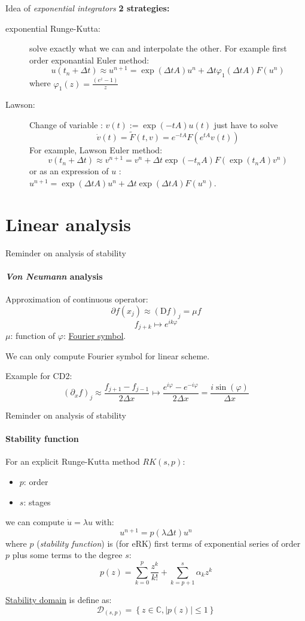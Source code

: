 \documentclass{beamer}
\begin{document}
\begin{frame}{Idea of \emph{exponential integrators}}
  \textbf{2 strategies:}
  \begin{description}
    \item[exponential Runge-Kutta:] solve exactly what we can and interpolate the other. For example first order exponantial Euler method: $$u(t_n+\Delta t) \approx u^{n+1} = \exp(\Delta tA)u^n + \Delta t\varphi_1(\Delta tA)F(u^n)$$ where $\varphi_1(z) = \frac{(e^z-1)}{z}$

    \item[Lawson:] Change of variable : $v(t):=\exp(-tA)u(t)$ just have to solve $$\dot{v}(t)=\tilde{F}(t,v)=e^{-tA}F(e^{tA}v(t))$$
    For example, Lawson Euler method:
    $$v(t_n+\Delta t) \approx v^{n+1} = v^{n} + \Delta t \exp(-t_n A) F(\exp(t_n A)v^{n})$$
     or as an expression of $u$ : $u^{n+1} = \exp(\Delta t A) u^{n} + \Delta t \exp(\Delta t A) F(u^{n})$.
  \end{description}
\end{frame}

\section{Linear analysis}
\begin{frame}{Reminder on analysis of stability}
  \framesubtitle{\emph{Von Neumann} analysis}
  Approximation of continuous operator:
  $$
    \partial f(x_j) \approx (\mathrm{D}f)_j = \mu f
  $$
  $$f_{j+k} \mapsto e^{ik \varphi}$$ $\mu$: function of $\varphi$: \underline{Fourier symbol}.

  We can only compute Fourier symbol for linear scheme.

  Example for CD2: $$(\partial_xf)_j\approx\frac{f_{j+1}-f_{j-1}}{2\Delta x}\mapsto \frac{e^{i\varphi}-e^{-i\varphi}}{2\Delta x}=\frac{i\sin(\varphi)}{\Delta x}$$
\end{frame}

\begin{frame}{Reminder on analysis of stability}
  \framesubtitle{Stability function}
  For an explicit Runge-Kutta method $RK(s,p)$: \begin{multicols}{2}\begin{itemize}\item $p$: order \item $s$: stages\end{itemize}\end{multicols} we can compute $\dot u = \lambda u$ with: $$u^{n+1} = p(\lambda\Delta t)u^n$$
  where $p$ (\emph{stability function}) is (for eRK) first terms of exponential series of order $p$ plus some terms to the degree $s$: $$p(z) = \sum_{k=0}^p\frac{z^k}{k!}+\sum_{k=p+1}^s\alpha_kz^k$$

  \underline{Stability domain} is define as: $$\mathcal{D}_{(s,p)} = \left\{ z\in\mathbb{C}, |p(z)|\leq 1 \right\}$$
\end{frame}
\end{document}
